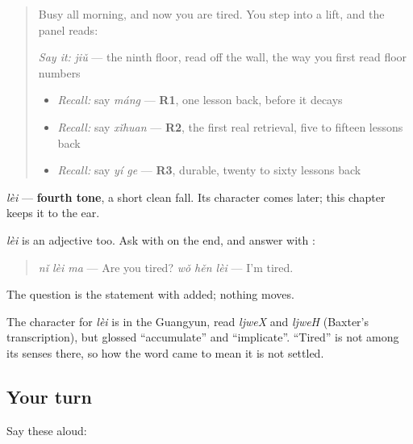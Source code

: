 \label{lesson:ZH-C30-lei}



\begin{quote}
Busy all morning, and now you are tired. You step into a lift, and the panel reads:

\begin{quote}
\end{quote}

\emph{Say it:} \emph{jiǔ} — the ninth floor, read off the wall, the way you first read floor numbers

\begin{itemize}
\raggedright
  \item \emph{Recall:} say \emph{máng} — \textbf{R1}, one lesson back, before it decays
  \item \emph{Recall:} say \emph{xǐhuan} — \textbf{R2}, the first real retrieval, five to fifteen lessons back
  \item \emph{Recall:} say \emph{yí ge} — \textbf{R3}, durable, twenty to sixty lessons back
\end{itemize}
\end{quote}

\begin{sounds}
\emph{lèi} — \textbf{fourth tone}, a short clean fall. Its character comes later; this chapter keeps it to the ear.
\end{sounds}

\begin{grammarlens}[title={Grammar Lens: a statement, then \zh{吗}}]
\emph{lèi} is an adjective too. Ask with  on the end, and answer with :

\begin{quote}
\emph{nǐ lèi ma} — Are you tired? \emph{wǒ hěn lèi} — I'm tired.
\end{quote}

The question is the statement with  added; nothing moves.
\end{grammarlens}

\begin{cousinweb}
The character for \emph{lèi} is in the Guangyun, read \emph{ljweX} and \emph{ljweH} (Baxter's transcription), but glossed \textquotedblleft{}accumulate\textquotedblright{} and \textquotedblleft{}implicate\textquotedblright{}. \textquotedblleft{}Tired\textquotedblright{} is not among its senses there, so how the word came to mean it is not settled.
\end{cousinweb}

\subsection*{Your turn}
Say these aloud:

